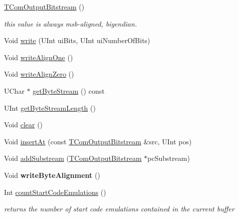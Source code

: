 \begin{DoxyCompactItemize}
\item 
\hyperlink{class_t_com_output_bitstream_a9b96f12947371caf73bbc102c09fa3bc}{T\+Com\+Output\+Bitstream} ()
\begin{DoxyCompactList}\small\item\em this value is always msb-\/aligned, bigendian. \end{DoxyCompactList}\item 
Void \hyperlink{class_t_com_output_bitstream_a804f4dcb6c5182a8d360d68ac849a85a}{write} (U\+Int ui\+Bits, U\+Int ui\+Number\+Of\+Bits)
\item 
Void \hyperlink{class_t_com_output_bitstream_a5e2f3821fe5bb5adcf2df7895ee40ef5}{write\+Align\+One} ()
\item 
Void \hyperlink{class_t_com_output_bitstream_a44084ff25ad330d205b4ffff714b3df0}{write\+Align\+Zero} ()
\item 
U\+Char $\ast$ \hyperlink{class_t_com_output_bitstream_a5cad8768ff2ebd63d447500bd1d67848}{get\+Byte\+Stream} () const
\item 
U\+Int \hyperlink{class_t_com_output_bitstream_af38a55f59d7cf832844961a9a2d3ff5a}{get\+Byte\+Stream\+Length} ()
\item 
Void \hyperlink{class_t_com_output_bitstream_a7eef394424aa099a7e93a184163620de}{clear} ()
\item 
Void \hyperlink{class_t_com_output_bitstream_a2a2fc7f96529112e47950a7404a4713e}{insert\+At} (const \hyperlink{class_t_com_output_bitstream}{T\+Com\+Output\+Bitstream} \&src, U\+Int pos)
\item 
Void \hyperlink{class_t_com_output_bitstream_ad6e51419b95e94857b333cf1f5c997c9}{add\+Substream} (\hyperlink{class_t_com_output_bitstream}{T\+Com\+Output\+Bitstream} $\ast$pc\+Substream)
\item 
\mbox{\label{class_t_com_output_bitstream_aeb49745ebaceac82f0b4d14ca9ce00f8}} 
Void {\bfseries write\+Byte\+Alignment} ()
\item 
\mbox{\label{class_t_com_output_bitstream_a20f9963cf95535ea50b992dcd56be077}} 
Int \hyperlink{class_t_com_output_bitstream_a20f9963cf95535ea50b992dcd56be077}{count\+Start\+Code\+Emulations} ()
\begin{DoxyCompactList}\small\item\em returns the number of start code emulations contained in the current buffer \end{DoxyCompactList}\end{DoxyCompactItemize}



